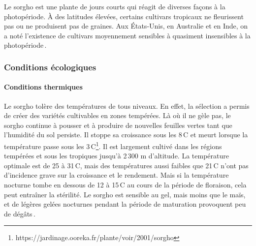 \documentclass[a4paper,11pt]{article}
\begin{document}
Le sorgho est une plante de jours courts qui réagit de diverses façons
à la photopériode. À des latitudes élevées, certains cultivars
tropicaux ne fleurissent pas ou ne produisent pas de graines. Aux
États-Unis, en Australie et en Inde, on a noté l’existence de
cultivars moyennement sensibles à quasiment insensibles à la
photopériode\,\cite{BARRO_KONDOMBO_2010}.

\subsubsection{Conditions écologiques}

\paragraph{Conditions thermiques} Le sorgho tolère des températures de
tous niveaux. En effet, la sélection a permis de créer des variétés
cultivables en zones tempérées. Là où il ne gèle pas, le sorgho
continue à pousser et à produire de nouvelles feuilles vertes tant que
l’humidité du sol persiste. Il stoppe sa croissance sous les
8\,\degree{}C et meurt lorsque la température passe sous les
3\,\degree{}C\footnote{https://jardinage.ooreka.fr/plante/voir/2001/sorgho}. Il
est largement cultivé dans les régions tempérées et sous les tropiques
jusqu’à 2\,300 m d’altitude. La température optimale est de 25 à
31\,\degree{}C, mais des températures aussi faibles que 21\,\degree{}C
n’ont pas d’incidence grave sur la croissance et le rendement. Mais si
la température nocturne tombe en dessous de 12 à 15\,\degree{}C au
cours de la période de floraison, cela peut entraîner la stérilité. Le
sorgho est sensible au gel, mais moins que le maïs, et de légères
gelées nocturnes pendant la période de maturation provoquent peu de
dégâts\,\cite{BARRO_KONDOMBO_2010}.
\end{document}
